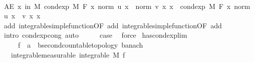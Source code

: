 \begin{isabellebody}
\ \isamarkupfalse%
\ {\isachardoublequoteopen}AE\ x\ in\ M{\isachardot}{\kern0pt}\ cond{\isacharunderscore}{\kern0pt}exp\ M\ F\ {\isacharparenleft}{\kern0pt}{\isasymlambda}x{\isachardot}{\kern0pt}\ norm\ {\isacharparenleft}{\kern0pt}u\ x{\isacharparenright}{\kern0pt}\ {\isacharplus}{\kern0pt}\ norm\ {\isacharparenleft}{\kern0pt}v\ x{\isacharparenright}{\kern0pt}{\isacharparenright}{\kern0pt}\ x\ {\isacharequal}{\kern0pt}\ cond{\isacharunderscore}{\kern0pt}exp\ M\ F\ {\isacharparenleft}{\kern0pt}{\isasymlambda}x{\isachardot}{\kern0pt}\ norm\ {\isacharparenleft}{\kern0pt}u\ x\ {\isacharplus}{\kern0pt}\ v\ x{\isacharparenright}{\kern0pt}{\isacharparenright}{\kern0pt}\ x{\isachardoublequoteclose}\ \isamarkupfalse%
\ add{\isacharparenleft}{\kern0pt}{}{\isacharparenright}{\kern0pt}\ integrable{\isacharunderscore}{\kern0pt}simple{\isacharunderscore}{\kern0pt}function{\isacharbrackleft}{\kern0pt}OF\ add{\isacharparenleft}{\kern0pt}{}{\isacharcomma}{\kern0pt}{}{\isacharparenright}{\kern0pt}{\isacharbrackright}{\kern0pt}\ integrable{\isacharunderscore}{\kern0pt}simple{\isacharunderscore}{\kern0pt}function{\isacharbrackleft}{\kern0pt}OF\ add{\isacharparenleft}{\kern0pt}{}{\isacharcomma}{\kern0pt}{}{\isacharparenright}{\kern0pt}{\isacharbrackright}{\kern0pt}\ \isamarkupfalse%
\ {\isacharparenleft}{\kern0pt}intro\ cond{\isacharunderscore}{\kern0pt}exp{\isacharunderscore}{\kern0pt}cong{\isacharcomma}{\kern0pt}\ auto{\isacharparenright}{\kern0pt}\isanewline
\ \ \isamarkupfalse%
\ \isamarkupfalse%
\ {\isacharquery}{\kern0pt}case\ \isamarkupfalse%
\ force\isanewline
{}\isamarkupfalse%
%
\endisatagproof
{\isafoldproof}%
%
\isadelimproof
\isanewline
%
\endisadelimproof
\isanewline
{}\isamarkupfalse%
\ has{\isacharunderscore}{\kern0pt}cond{\isacharunderscore}{\kern0pt}exp{\isacharunderscore}{\kern0pt}lim{\isacharcolon}{\kern0pt}\isanewline
\ \ \ \ \ f\ {\isacharcolon}{\kern0pt}{\isacharcolon}{\kern0pt}\ {\isachardoublequoteopen}{\isacharprime}{\kern0pt}a\ {\isasymRightarrow}\ {\isacharprime}{\kern0pt}b{\isacharcolon}{\kern0pt}{\isacharcolon}{\kern0pt}{\isacharbraceleft}{\kern0pt}second{\isacharunderscore}{\kern0pt}countable{\isacharunderscore}{\kern0pt}topology{\isacharcomma}{\kern0pt}\ banach{\isacharbraceright}{\kern0pt}{\isachardoublequoteclose}\isanewline
\ \ \ integrable{\isacharbrackleft}{\kern0pt}measurable{\isacharbrackright}{\kern0pt}{\isacharcolon}{\kern0pt}\ {\isachardoublequoteopen}integrable\ M\ f{\isachardoublequoteclose}\isanewline

\end{isabellebody}
